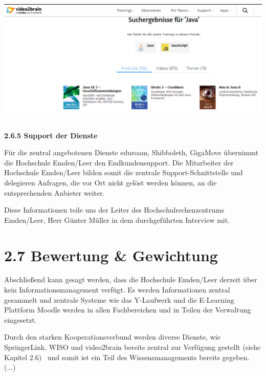 \documentclass[a4paper]{article}
\makeatletter
\newcommand\captionof[1]{\def\@captype{#1}\caption}
\makeatother
\begin{document}
\includegraphics[width=15.501cm,height=6.482cm]{EntwurfKapitel2Gruppe220150528VW-img/EntwurfKapitel2Gruppe220150528VW-img013.png}
\captionof{figure}[Suchergebnisse für Java bei video2brain
(https://www.video2brain.com/de/search.htm?search\_entry=Java)]{Suchergebnisse für Java bei video2brain
(https://www.video2brain.com/de/search.htm?search\_entry=Java)}



\bigskip

{\sffamily\bfseries\color{black}
2.6.5 Support der Dienste}


\bigskip

{\sffamily\mdseries\color{black}
Für die zentral angebotenen Dienste eduroam, Shibboleth, GigaMove übernimmt die Hochschule Emden/Leer den
Endkundensupport. Die Mitarbeiter der Hochschule Emden/Leer bilden somit die zentrale Support-Schnittstelle und
delegieren Anfragen, die vor Ort nicht gelöst werden können, an die entsprechenden Anbieter weiter.}


\bigskip

{\sffamily\mdseries\color{black}
Diese Informationen teile uns der Leiter des Hochschulrechenzentrums Emden/Leer, Herr Günter Müller in dem
durchgeführten Interview mit.}

\section{2.7 Bewertung \& Gewichtung}
{\sffamily\mdseries\color{black}
Abschließend kann gesagt werden, dass die Hochschule Emden/Leer derzeit über kein Informationsmanagement verfügt. Es
werden Informationen zentral gesammelt und zentrale Systeme wie das Y-Laufwerk und die E-Learning Plattform Moodle
werden in allen Fachbereichen und in Teilen der Verwaltung eingesetzt.}

{\sffamily\mdseries\color{black}
Durch den starken Kooperationsverbund werden diverse Dienste, wie SpringerLink, WISO und video2brain bereits zentral zur
Verfügung gestellt (siehe Kapitel 2.6) \ und somit ist ein Teil des Wissensmanagements bereits gegeben. (...)}


\bigskip


\bigskip


\bigskip


\bigskip
\end{document}
